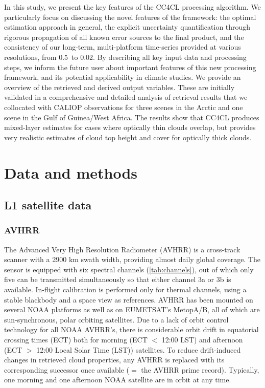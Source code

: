 In this study, we present the key features of the CC4CL processing algorithm. We particularly focus on discussing the novel features of the framework: the optimal estimation approach in general, the explicit uncertainty quantification through rigorous propagation of all known error sources to the final product, and the consistency of our long-term, multi-platform time-series provided at various resolutions, from 0.5\textdegree\ to 0.02\textdegree. By describing all key input data and processing steps, we inform the future user about important features of this new processing framework, and its potential applicability in climate studies. We provide an overview of the retrieved and derived output variables. These are initially validated in a comprehensive and detailed analysis of retrieval results that we collocated with CALIOP observations for three scenes in the Arctic and one scene in the Gulf of Guinea/West Africa. The results show that CC4CL produces mixed-layer estimates for cases where optically thin clouds overlap, but provides very realistic estimates of cloud top height and cover for optically thick clouds.

\section{Data and methods}\label{input_data}

\subsection{L1 satellite data}\label{sec:L1_data}

\subsubsection{AVHRR}

The Advanced Very High Resolution Radiometer (AVHRR) is a cross-track scanner with a 2900 km swath width, providing almost daily global coverage. The sensor is equipped with six spectral channels (\autoref{tab:channels}), out of which only five can be transmitted simultaneously so that either channel 3a or 3b is available. In-flight calibration is performed only for thermal channels, using a stable blackbody and a space view as references. AVHRR has been mounted on several NOAA platforms as well as on EUMETSAT's MetopA/B, all of which are sun-synchronous, polar orbiting satellites. Due to a lack of orbit control technology for all NOAA AVHRR's, there is considerable orbit drift in equatorial crossing times (ECT) both for morning (ECT $<$ 12:00 LST) and afternoon (ECT $>$ 12:00 Local Solar Time (LST)) satellites. To reduce drift-induced changes in retrieved cloud properties, any AVHRR is replaced with its corresponding successor once available ($=$ the AVHRR prime record). Typically, one morning and one afternoon NOAA satellite are in orbit at any time. 

